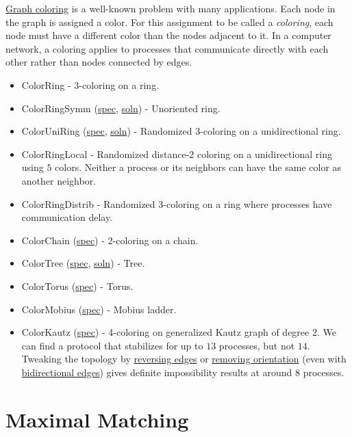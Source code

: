 \href{http://en.wikipedia.org/wiki/Graph_coloring}{Graph coloring} is a well-known problem with many applications.
Each node in the graph is assigned a color.
For this assignment to be called a \textit{coloring}, each node must have a different color than the nodes adjacent to it.
In a computer network, a coloring applies to processes that communicate directly with each other rather than nodes connected by edges.
\begin{itemize}
\item ColorRing \href{Coloring.html#sec:ColorRing}{\LinkText}
- 3-coloring on a ring.
\item ColorRingSymm (\href{\examplespec/ColorRingSymm.prot}{spec}, \href{\examplesoln/ColorRingSymm.prot}{soln})
- Unoriented ring.
\item ColorUniRing (\href{\examplespec/ColorUniRing.prot}{spec}, \href{\examplesoln/ColorUniRing.prot}{soln})
- Randomized 3-coloring on a unidirectional ring.
\item ColorRingLocal \href{Coloring.html#sec:ColorRingLocal}{\LinkText}
- Randomized distance-2 coloring on a unidirectional ring using $5$ colors.
Neither a process or its neighbors can have the same color as another neighbor.
\item ColorRingDistrib \href{Coloring.html#sec:ColorRingDistrib}{\LinkText}
- Randomized 3-coloring on a ring where processes have communication delay.
\item ColorChain (\href{\examplespec/ColorChain.prot}{spec})
- 2-coloring on a chain.
\item ColorTree (\href{\examplespec/ColorTree.prot}{spec}, \href{\examplesoln/ColorTree.prot}{soln})
- Tree.
\item ColorTorus (\href{\examplespec/ColorTorus.prot}{spec})
- Torus.
\item ColorMobius (\href{\examplespec/ColorMobius.prot}{spec})
- Mobius ladder.
\item ColorKautz (\href{\examplespec/ColorKautz.prot}{spec})
- 4-coloring on generalized Kautz graph of degree 2.
We can find a protocol that stabilizes for up to $13$ processes, but not $14$.
Tweaking the topology by
\href{\examplespec/ColorKautzReverse.prot}{reversing edges}
or
\href{\examplespec/ColorKautzSymm.prot}{removing orientation}
(even with \href{\examplespec/ColorKautzBi.prot}{bidirectional edges})
gives definite impossibility results at around $8$ processes.
\end{itemize}

\section{Maximal Matching}

